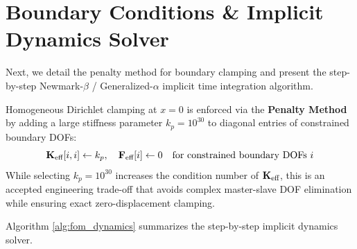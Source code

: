 \section{Boundary Conditions \& Implicit Dynamics Solver}

Next, we detail the penalty method for boundary clamping and present the step-by-step Newmark-$\beta$ / Generalized-$\alpha$ implicit time integration algorithm.

Homogeneous Dirichlet clamping at $x=0$ is enforced via the \textbf{Penalty Method} by adding a large stiffness parameter $k_p = 10^{30}$ to diagonal entries of constrained boundary DOFs:
\begin{equation}
    \mathbf{K}_{\text{eff}}[i, i] \gets k_p, \quad \mathbf{F}_{\text{eff}}[i] \gets 0 \quad \text{for constrained boundary DOFs } i
\end{equation}
While selecting $k_p = 10^{30}$ increases the condition number of $\mathbf{K}_{\text{eff}}$, this is an accepted engineering trade-off that avoids complex master-slave DOF elimination while ensuring exact zero-displacement clamping.

Algorithm \ref{alg:fom_dynamics} summarizes the step-by-step implicit dynamics solver.

